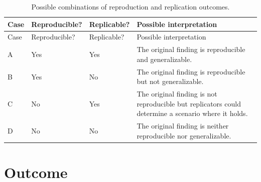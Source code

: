 \documentclass[
  letterpaper,
  DIV=11,
  openany,
  fontsize=12pt,
  parskip=half,
  headings=big,
  numbers=noenddot,
  titlepage=false]{scrreprt}
\begin{document}
\begin{longtable}[]{@{}
  >{\raggedright\arraybackslash}p{}
  >{\raggedright\arraybackslash}p{}
  >{\raggedright\arraybackslash}p{}
  >{\raggedright\arraybackslash}p{}@{}}
\caption{Possible combinations of reproduction and replication
outcomes.}\label{tbl-rep-outcomes}\tabularnewline
\toprule\noalign{}
\begin{minipage}[b]{\linewidth}\raggedright
Case
\end{minipage} & \begin{minipage}[b]{\linewidth}\raggedright
Reproducible?
\end{minipage} & \begin{minipage}[b]{\linewidth}\raggedright
Replicable?
\end{minipage} & \begin{minipage}[b]{\linewidth}\raggedright
Possible interpretation
\end{minipage} \\
\midrule\noalign{}
\endfirsthead
\toprule\noalign{}
\begin{minipage}[b]{\linewidth}\raggedright
Case
\end{minipage} & \begin{minipage}[b]{\linewidth}\raggedright
Reproducible?
\end{minipage} & \begin{minipage}[b]{\linewidth}\raggedright
Replicable?
\end{minipage} & \begin{minipage}[b]{\linewidth}\raggedright
Possible interpretation
\end{minipage} \\
\midrule\noalign{}
\endhead
\bottomrule\noalign{}
\endlastfoot
A & Yes & Yes & The original finding is reproducible and
generalizable. \\
B & Yes & No & The original finding is reproducible but not
generalizable. \\
C & No & Yes & The original finding is not reproducible but replicators
could determine a scenario where it holds. \\
D & No & No & The original finding is neither reproducible nor
generalizable. \\
\end{longtable}

\section{Outcome}\label{outcome}
\end{document}
